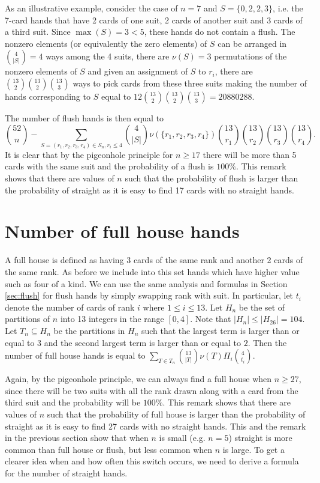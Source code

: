 \documentclass{article}
\begin{document}
As an illustrative example, consider the case of $n=7$ and $S=\{0,2,2,3\}$, i.e. the 7-card hands that have 2 cards of one suit, 2 cards of another suit and 3 cards of a third suit. Since $\max(S)=3 < 5$, these hands do not contain a flush. The nonzero elements (or equivalently the zero elements) of $S$ can be arranged in $\binom{4}{|S|}=4$ ways among the 4 suits, there are $\nu(S)=3$ permutations of the nonzero elements of $S$
and given an assignment of $S$ to $r_i$, there are $\binom{13}{2}\binom{13}{2}\binom{13}{3}$ ways to pick cards from these three suits making the number of hands corresponding to $S$ equal to $12\binom{13}{2}\binom{13}{2}\binom{13}{3}=20880288$.

The number of flush hands is then equal to 
$$\binom{52}{n}-\sum_{S=(r_1,r_2,r_3,r_4)\in S_n, r_i\leq 4}\binom{4}{|S|}\nu(\{r_1,r_2,r_3,r_4\})\binom{13}{r_1}\binom{13}{r_2}\binom{13}{r_3}\binom{13}{r_4}.$$
It is clear that by the pigeonhole principle for $n\geq 17$ there will be more than 5 cards with the same suit and the probability of a flush is $100\%$.
This remark shows that there are values of $n$ such that the probability of flush is larger than the probability of straight as it is easy to find 17 cards with no straight hands.

\section{Number of full house hands}
\label{sec:full}
A full house is defined as having 3 cards of the same rank and another 2 cards of the same rank. 
As before we include into this set hands which have higher value such as four of a kind.
We can use the same analysis and formulas in Section \ref{sec:flush} for flush hands
by simply swapping rank with suit. In particular, let $t_i$ denote the number of cards of rank $i$ where $1\leq i\leq 13$.
Let $H_n$
be the set of partitions of $n$ into 13 integers in the range
$[0,4]$.  Note that $|H_n|\leq |H_{26}|=104$. Let $T_n\subseteq H_n$ be the partitions in $H_n$ such that the largest term is larger than or equal to 3 and the second largest term is larger than or equal to $2$.
Then the number of full house hands is equal to 
$\sum_{T\in T_n}\binom{13}{|T|}\nu(T)\Pi_i\binom{4}{t_i}$.

Again, by the pigeonhole principle, we can always find a full house when $n\geq 27$, since there will be two suits with all the rank drawn along with a card from the third suit and the probability will be $100\%$. This remark shows that there are values of $n$ such that the probability of full house is larger than the probability of straight as it is easy to find 27 cards with no straight hands. This and the remark in the previous section show that when $n$ is small (e.g. $n=5$) straight is more common than full house or flush, but less common when $n$ is large. To get a clearer idea when and how often this switch occurs, we need to derive a formula for the number of straight hands. 
\end{document}
